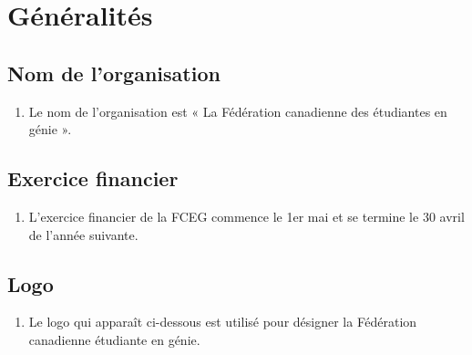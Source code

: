 \section{Généralités}
\label{generalites}

\subsection{Nom de l'organisation}
\label{generalites-nom-de-l-organisation}

\begin{enumerate}
 \item Le nom de l'organisation est « La Fédération canadienne des étudiantes en génie ».
\end{enumerate}

\subsection{Exercice financier}
\label{generalites-exercice-financier}

\begin{enumerate}
 \item L'exercice financier de la FCEG commence le 1er mai et se termine le 30 avril de l'année suivante.
\end{enumerate}

\subsection{Logo}
\label{generalites-logo}

\begin{enumerate}
 \item Le logo qui apparaît ci-dessous est utilisé pour désigner la Fédération canadienne étudiante en génie.
\end{enumerate}
